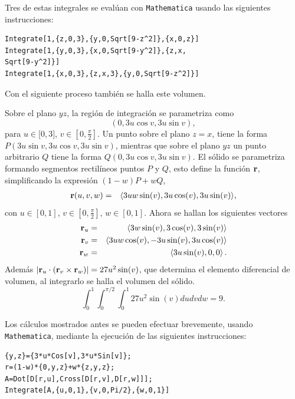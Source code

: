 Tres de estas integrales se evalúan con \verb"Mathematica" usando las siguientes instrucciones:

\begin{tcolorbox}[title=\bf Instrucción en \verb"Mathematica"]\begin{Verbatim}[formatcom=\letraverbatim]
Integrate[1,{z,0,3},{y,0,Sqrt[9-z^2]},{x,0,z}]
Integrate[1,{y,0,3},{x,0,Sqrt[9-y^2]},{z,x,
Sqrt[9-y^2]}]
Integrate[1,{x,0,3},{z,x,3},{y,0,Sqrt[9-z^2]}]
\end{Verbatim}
\end{tcolorbox}

Con el siguiente proceso también se halla este volumen.

Sobre el plano $yz$, la región de integración se parametriza como
\[(0,3u\cos v,3u\sin v),\] para $u\in \lbrack 0,3]$, $v\in [0,\frac{\pi}{2}]$. Un punto sobre el plano $z=x$, tiene la forma
$P(3u\sin v,3u\cos v,3u\sin v) $, mientras que sobre el plano $yz$ un punto arbitrario $Q$ tiene la forma $Q(0,3u\cos v,3u\sin v) $.
El sólido se parametriza formando segmentos rectilíneos puntos $P$ y $Q$,
esto define la función ${\bf r}$, simplificando la expresión $(1-w)P + wQ$,
\begin{eqnarray*}
{\bf r}(u,v,w) &=&\langle3 u w \sin (v),3 u \cos (v),3 u \sin (v)\rangle,
\end{eqnarray*}
con $u\in [0,1]$, $v\in [ 0,\frac{\pi }{2}]$, $w\in [0,1]$. Ahora se hallan los siguientes vectores
\begin{eqnarray*}
{\bf r}_{u}&=&\left\langle 3 w \sin (v),3 \cos (v),3 \sin (v)\right\rangle \\
{\bf r}_{v}&=&\left\langle 3 u w \cos (v),-3 u \sin (v),3 u \cos (v) \right\rangle \\
{\bf r}_{w}&=&\left\langle 3 u \sin (v),0,0 \right\rangle .
\end{eqnarray*}
Además $\left| {\bf r}_{u}\cdot \left( {\bf r}_{v}\times {\bf r}_{w}\right) \right| = 27u^{2}\sin(v)$, que determina el elemento diferencial de volumen, al integrarlo se halla el volumen del sólido.
\[\int_{0}^{1}\int_{0}^{\pi /2}\int_{0}^{1} 27u^{2}\sin(v) dudvdw=9.\]

Los cálculos mostrados antes se pueden efectuar brevemente, usando \verb"Mathematica",
mediante la ejecución de las siguientes instrucciones:

\begin{tcolorbox}[title=\bf Instrucción en \verb"Mathematica"]\begin{Verbatim}[formatcom=\letraverbatim]
{y,z}={3*u*Cos[v],3*u*Sin[v]};
r=(1-w)*{0,y,z}+w*{z,y,z};
A=Dot[D[r,u],Cross[D[r,v],D[r,w]]];
Integrate[A,{u,0,1},{v,0,Pi/2},{w,0,1}]
\end{Verbatim}
\end{tcolorbox}

